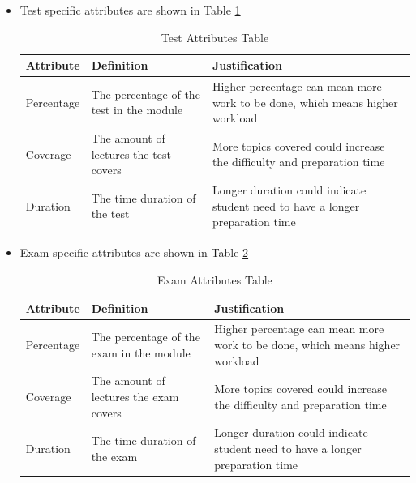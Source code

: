 \documentclass[fyp]{socreport}
\begin{document}
\begin{itemize}
	\item Test specific attributes are shown in Table {\ref{test-attribute}}
	\begin{table}[]
	\centering
	\begin{tabular}{|p{}|p{}|p{}|}
	\hline
		\rowcolor[HTML]{C0C0C0}
	  \textbf{Attribute} & \textbf{Definition} & \textbf{Justification} \\
	\hline
	Percentage & The percentage of the test in the module & Higher percentage can mean more work to be done, which means higher workload \\
	\hline
	Coverage & The amount of lectures the test covers & More topics covered could increase the difficulty and preparation time \\
	\hline
	Duration & The time duration of the test & Longer duration could indicate student need to have a longer preparation time \\
	\hline
	\end{tabular}
	\caption{Test Attributes Table}
	\label{test-attribute}
	\end{table}

	\item Exam specific attributes are shown in Table {\ref{exam-attribute}}
	\begin{table}[]
	\centering
	\begin{tabular}{|p{}|p{}|p{}|}
	\hline
		\rowcolor[HTML]{C0C0C0}
	  \textbf{Attribute} & \textbf{Definition} & \textbf{Justification} \\
	\hline
	Percentage & The percentage of the exam in the module & Higher percentage can mean more work to be done, which means higher workload \\
	\hline
	Coverage & The amount of lectures the exam covers & More topics covered could increase the difficulty and preparation time \\
	\hline
	Duration & The time duration of the exam & Longer duration could indicate student need to have a longer preparation time \\
	\hline
	\end{tabular}
	\caption{Exam Attributes Table}
	\label{exam-attribute}
	\end{table}
\end{itemize}
\end{document}
